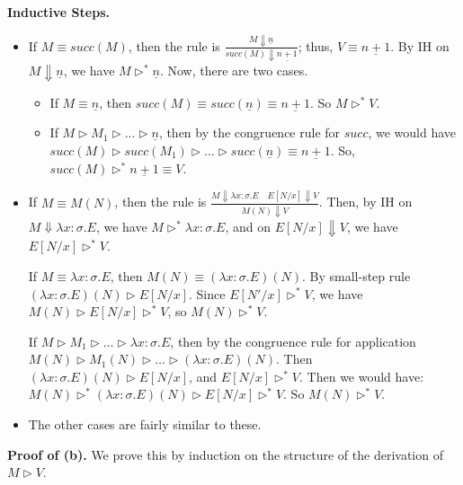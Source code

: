     \textbf{Inductive Steps.}
    \begin{itemize}
        \item If $M \equiv succ(M)$, then the rule is $\frac{M \Downarrow \underline{n}}{succ(M) \Downarrow \underline{n+1}}$; thus, $V \equiv \underline{n+1}$.
              By IH on $M \Downarrow \underline{n}$, we have $M \rhd^* \underline{n}$. Now, there are two cases.
              \begin{itemize}
                \item If $M \equiv \underline{n}$, then $succ(M) \equiv succ(\underline{n}) \equiv \underline{n+1}$. So $M \rhd^* V$.
                \item If $M \rhd M_1 \rhd ... \rhd \underline{n}$, then by the congruence rule for $succ$, we would have $succ(M) \rhd succ(M_1) \rhd ... \rhd succ(\underline{n}) \equiv \underline{n+1}$.
                      So, $succ(M) \rhd^* \underline{n+1} \equiv V$.
              \end{itemize}
        
        \item If $M \equiv M(N)$, then the rule is $\frac{M \Downarrow \lambda x:\sigma.E \quad E[N/x] \Downarrow V}{M(N) \Downarrow V}$. Then, by IH on $M \Downarrow \lambda x:\sigma.E$,
              we have $M \rhd^* \lambda x:\sigma.E$, and on $E[N/x] \Downarrow V$, we have $E[N/x] \rhd^* V$.
              
              If $M \equiv \lambda x:\sigma.E$, then $M(N) \equiv (\lambda x:\sigma.E)(N)$. 
                By small-step rule $(\lambda x:\sigma.E)(N) \rhd E[N/x]$. Since $E[N'/x] \rhd^* V$, we have $M(N) \rhd E[N/x] \rhd^* V$, so $M(N) \rhd^* V$.
    

              If $M \rhd M_1 \rhd \dots \rhd \lambda x:\sigma.E$, then by the congruence rule for application $M(N) \rhd M_1(N) \rhd \dots \rhd (\lambda x:\sigma.E)(N)$.
                Then $(\lambda x:\sigma.E)(N) \rhd E[N/x]$, and $E[N/x] \rhd^* V$.
                Then we would have: $M(N) \rhd^* (\lambda x:\sigma.E)(N) \rhd E[N/x] \rhd^* V$. So $M(N) \rhd^* V$.
        
        \item The other cases are fairly similar to these. 
    \end{itemize}
    \textbf{Proof of (b).} We prove this by induction on the structure of the derivation of $M \rhd V$.

